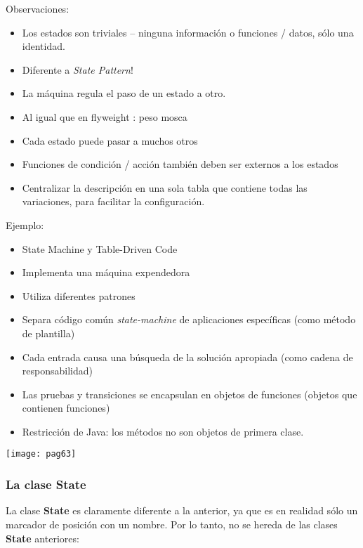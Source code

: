 Observaciones:

\begin{itemize}
    \item Los estados son triviales – ninguna información o funciones / datos, sólo una identidad.
    \item Diferente a \textit{State Pattern}!
    \item La máquina regula el paso de un estado a otro.
    \item Al igual que en flyweight : peso mosca
    \item Cada estado puede pasar a muchos otros
    \item Funciones de condición / acción también deben ser externos a los estados
    \item Centralizar la descripción en una sola tabla que contiene todas las variaciones, para facilitar la configuración.
\end{itemize}

Ejemplo:

\begin{itemize}
    \item State Machine y Table-Driven Code 
    \item Implementa una máquina expendedora
    \item Utiliza diferentes patrones
    \item Separa código común \textit{state-machine} de aplicaciones específicas (como método de plantilla)
    \item Cada entrada causa una búsqueda de la solución apropiada (como cadena de responsabilidad)
    \item Las pruebas y transiciones se encapsulan en objetos de funciones (objetos que contienen funciones)
    \item Restricción de Java: los métodos no son objetos de primera clase.
\end{itemize}

\texttt{[image: pag63]}  


\subsubsection*{La clase State}
\label{subsubsec:lcs}

 La clase \textbf{State} es claramente diferente a la anterior, ya que es en realidad sólo un marcador de posición con un nombre. Por lo tanto, no se hereda de las clases \textbf{State} anteriores:    \newline
 
